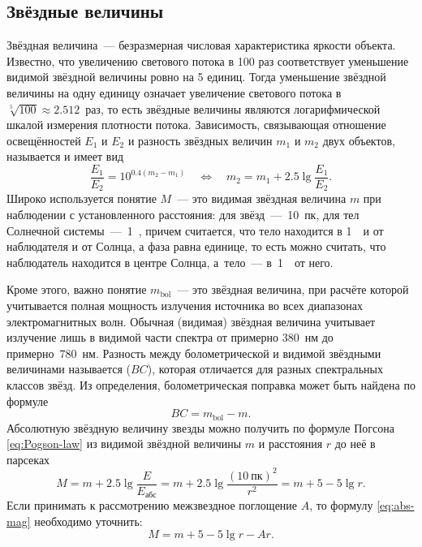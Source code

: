 \subsection{Звёздные величины}
Звёздная величина~--- безразмерная числовая характеристика яркости объекта. Известно, что увеличению светового потока в 100 раз соответствует уменьшение видимой звёздной величины ровно на 5 единиц. Тогда уменьшение звёздной величины на одну единицу означает увеличение светового потока в $\sqrt[5]{100}\approx 2.512$~раз, то есть звёздные величины являются логарифмической шкалой измерения плотности потока. Зависимость, связывающая отношение освещённостей $E_1$ и $E_2$ и разность звёздных величин $m_1$ и $m_2$ двух объектов, называется  и имеет вид
\begin{equation}
	\frac{E_1}{E_2} = 10^{0.4(m_2 - m_1)} \quad \Longleftrightarrow \quad m_2 = m_1 + 2.5 \lg \frac{E_1}{E_2}.
	\label{eq:Pogson-law}
\end{equation}
Широко используется понятие  $M$~--- это видимая звёздная величина $m$ при наблюдении с установленного расстояния: для звёзд~---~10~пк, для тел Солнечной системы~---~1~\au, причем считается, что тело находится в 1~\au~и от наблюдателя и от Солнца, а фаза равна единице, то есть можно считать, что наблюдатель находится в центре Солнца, а~тело~--- в~1~\au~от него. 

Кроме этого, важно понятие  $m_\text{bol}$~--- это звёздная величина, при расчёте которой учитывается полная мощность излучения источника во всех диапазонах электромагнитных волн. Обычная (видимая) звёздная величина учитывает излучение лишь в видимой части спектра от примерно 380~нм до примерно~780~нм. Разность между болометрической и видимой звёздными величинами называется  ($BC$), которая отличается для разных спектральных классов звёзд. Из определения, болометрическая поправка может быть найдена по формуле
\begin{equation}
	BC = m_\text{bol} - m.
\end{equation}
Абсолютную звёздную величину звезды можно получить по формуле Погсона \eqref{eq:Pogson-law} из видимой звёздной величины $m$ и расстояния $r$ до неё в парсеках
\begin{equation}
	M = m + 2.5 \lg \frac{E}{E_\text{абс}} = m + 2.5 \lg \frac{(10~\text{пк})^2}{r^2} = m + 5 - 5\lg r.
	\label{eq:abs-mag}
\end{equation} 
Если принимать к рассмотрению межзвездное поглощение $A$, то формулу  \eqref{eq:abs-mag} необходимо уточнить:
\begin{equation}
	M = m + 5 - 5\lg r - Ar.
\end{equation}